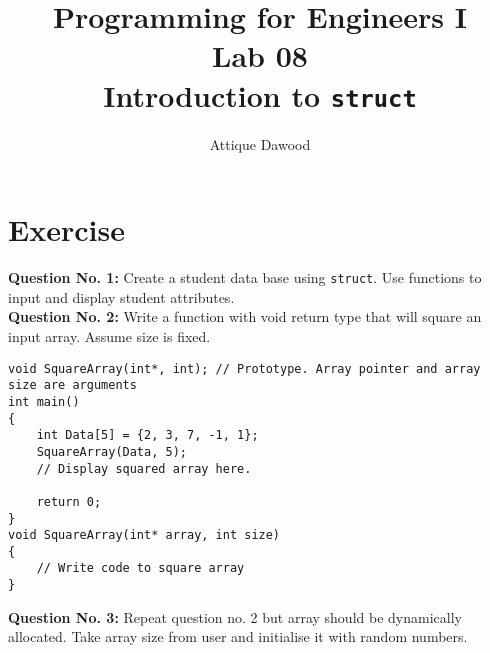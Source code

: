 \documentclass[12pt,a4paper]{article}
\title{Programming for Engineers I\\Lab 08\\Introduction to \texttt{struct}}
\author{Attique Dawood}
\begin{document}
\maketitle
\section{Exercise}
\textbf{Question No. 1:} Create a student data base using \texttt{struct}. Use functions to input and display student attributes.\\
\textbf{Question No. 2:} Write a function with void return type that will square an input array. Assume size is fixed.
\begin{lstlisting}[caption={Square using array pointer}]
void SquareArray(int*, int); // Prototype. Array pointer and array size are arguments
int main()
{
	int Data[5] = {2, 3, 7, -1, 1};
	SquareArray(Data, 5);
	// Display squared array here.

	return 0;
}
void SquareArray(int* array, int size)
{
	// Write code to square array
}
\end{lstlisting}
\textbf{Question No. 3:} Repeat question no. 2 but array should be dynamically allocated. Take array size from user and initialise it with random numbers.
\end{document}
